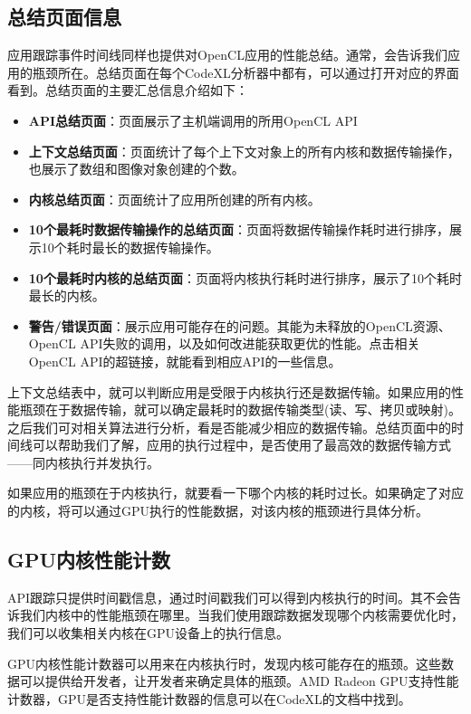 \subsection{总结页面信息}

应用跟踪事件时间线同样也提供对OpenCL应用的性能总结。通常，会告诉我们应用的瓶颈所在。总结页面在每个CodeXL分析器中都有，可以通过打开对应的界面看到。总结页面的主要汇总信息介绍如下：

\begin{itemize}
\item \textbf{API总结页面}：页面展示了主机端调用的所用OpenCL API
\item \textbf{上下文总结页面}：页面统计了每个上下文对象上的所有内核和数据传输操作，也展示了数组和图像对象创建的个数。
\item \textbf{内核总结页面}：页面统计了应用所创建的所有内核。
\item \textbf{10个最耗时数据传输操作的总结页面}：页面将数据传输操作耗时进行排序，展示10个耗时最长的数据传输操作。
\item \textbf{10个最耗时内核的总结页面}：页面将内核执行耗时进行排序，展示了10个耗时最长的内核。
\item \textbf{警告/错误页面}：展示应用可能存在的问题。其能为未释放的OpenCL资源、OpenCL API失败的调用，以及如何改进能获取更优的性能。点击相关OpenCL API的超链接，就能看到相应API的一些信息。
\end{itemize}

上下文总结表中，就可以判断应用是受限于内核执行还是数据传输。如果应用的性能瓶颈在于数据传输，就可以确定最耗时的数据传输类型(读、写、拷贝或映射)。之后我们可对相关算法进行分析，看是否能减少相应的数据传输。总结页面中的时间线可以帮助我们了解，应用的执行过程中，是否使用了最高效的数据传输方式——同内核执行并发执行。

如果应用的瓶颈在于内核执行，就要看一下哪个内核的耗时过长。如果确定了对应的内核，将可以通过GPU执行的性能数据，对该内核的瓶颈进行具体分析。

\subsection{GPU内核性能计数}

API跟踪只提供时间戳信息，通过时间戳我们可以得到内核执行的时间。其不会告诉我们内核中的性能瓶颈在哪里。当我们使用跟踪数据发现哪个内核需要优化时，我们可以收集相关内核在GPU设备上的执行信息。

GPU内核性能计数器可以用来在内核执行时，发现内核可能存在的瓶颈。这些数据可以提供给开发者，让开发者来确定具体的瓶颈。AMD Radeon GPU支持性能计数器，GPU是否支持性能计数器的信息可以在CodeXL的文档中找到。

